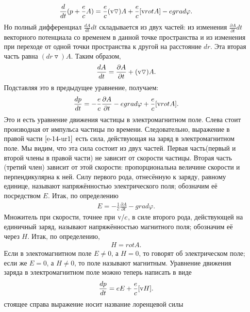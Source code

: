 \begin{gather*}
	\frac{d}{dt}(p + \frac{e}{c}A) = \frac{e}{c}(\textnormal{v}\triangledown)A + \frac{e}{c}[\textnormal{v}rotA] - egrad\varphi.
\end{gather*}
Но полный дифференциал $\frac{dA}{dt}dt$ складывается из двух частей: из изменения $\frac{\partial A}{\partial t}dt$ векторного потенциала со временем в данной точке пространства и из изменения при переходе от одной точки пространства к другой на расстояние $dr$. Эта вторая часть равна $(dr\triangledown)A$. Таким образом,
\begin{gather*}
	\frac{dA}{dt} = \frac{\partial A}{\partial t} + (\textnormal{v}\triangledown)A.
\end{gather*}
Подставляя это в предыдущее уравнение, получаем:
\begin{gather}
	\label{e-14-ur1}
	\frac{dp}{dt} = -\frac{e}{c}\frac{\partial A}{\partial t} - egrad\varphi + \frac{e}{c}[\textnormal{v}rotA].
\end{gather}
Это и есть уравнение движения частицы в электромагнитном поле. Слева стоит производная от импульса частицы по времени. Следовательно, выражение в правой части $\ref{e-14-ur1}$ есть сила, действующая на заряд в электромагнитном поле. Мы видим, что эта сила состоит из двух частей. Первая часть(первый и второй члены в правой части) не зависит от скорости частицы. Вторая часть (третий член) зависит от этой скорости: пропорциональна величине скорости и перпендикулярна к ней.
Силу первого рода, отнесённую к заряду, равному единице, называют  напряжённостью электрического поля; обозначим её посредством $E$. Итак, по определению
\begin{gather}
	\label{e-14-ur2}
	E = -\frac{1}{c}\frac{\partial A}{\partial t} - grad \varphi.
\end{gather}
Множитель при скорости, точнее при $\textnormal{v}/c$, в силе второго рода, действующей на единичный заряд, называют напряжённостью магнитного поля; обозначим её через $H$. Итак, по определению,
\begin{gather*}
	\label{e-14-ur3}
	H = rot A.
\end{gather*}
Если в электомагнитном поле $E\ne0$, а $H=0$, то говорят об электрическом поле; если же $E=0$, а $H\ne0$, то поле называют магнитным. 
Уравнение движения заряда в электромагнитном поле можно теперь написать в виде
\begin{gather*}
	\frac{dp}{dt} = eE + \frac{e}{c}[\textnormal{v}H].
\end{gather*}
стоящее справа выражение носит название лоренцевой силы\\


